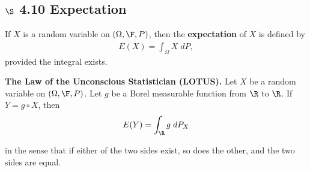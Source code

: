 \documentclass{article} %
\begin{document}
\subsection{$\S$ 4.10 Expectation}

\begin{definition}
If $X$ is a random variable on $(\Omega, \F, P)$, then the \textbf{expectation} of $X$ is defined by
\begin{align}
E(X) = \int_\Omega X \; dP,
\label{eqn:def_expectation}
\end{align}
provided the integral exists.
\label{def:expectation}
\end{definition}

\begin{theorem}{\textbf{The Law of the Unconscious Statistician (LOTUS).}}
Let $X$ be a random variable on $(\Omega, \F, P)$.  Let $g$ be a Borel measurable function from $\R$ to $\R$.  If $Y = g \circ X$, then 
\begin{align}
 E(Y) = \int_\R g \; dP_X
\label{eqn:expectation_as_integral_wrt_induced_probability_measure}	
\end{align}

in the sense that if either of the two sides exist, so does the other, and the two sides are equal.
\label{thm:LOTUS}	
\end{theorem}
\end{document}
